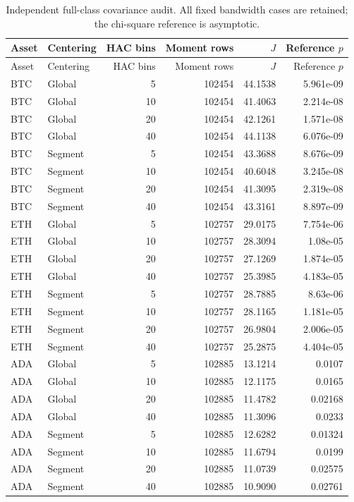 {\small
\begin{longtable}{llrrrr}
\caption{Independent full-class covariance audit. All fixed bandwidth cases are retained; the chi-square reference is asymptotic.}\label{tab:covariance_audit_complete}\\
\toprule Asset & Centering & HAC bins & Moment rows & $J$ & Reference $p$\\\midrule\endfirsthead
\toprule Asset & Centering & HAC bins & Moment rows & $J$ & Reference $p$\\\midrule\endhead
\bottomrule\endfoot
BTC & Global & 5 & 102454 & 44.1538 & 5.961e-09\\
BTC & Global & 10 & 102454 & 41.4063 & 2.214e-08\\
BTC & Global & 20 & 102454 & 42.1261 & 1.571e-08\\
BTC & Global & 40 & 102454 & 44.1138 & 6.076e-09\\
BTC & Segment & 5 & 102454 & 43.3688 & 8.676e-09\\
BTC & Segment & 10 & 102454 & 40.6048 & 3.245e-08\\
BTC & Segment & 20 & 102454 & 41.3095 & 2.319e-08\\
BTC & Segment & 40 & 102454 & 43.3161 & 8.897e-09\\
ETH & Global & 5 & 102757 & 29.0175 & 7.754e-06\\
ETH & Global & 10 & 102757 & 28.3094 & 1.08e-05\\
ETH & Global & 20 & 102757 & 27.1269 & 1.874e-05\\
ETH & Global & 40 & 102757 & 25.3985 & 4.183e-05\\
ETH & Segment & 5 & 102757 & 28.7885 & 8.63e-06\\
ETH & Segment & 10 & 102757 & 28.1165 & 1.181e-05\\
ETH & Segment & 20 & 102757 & 26.9804 & 2.006e-05\\
ETH & Segment & 40 & 102757 & 25.2875 & 4.404e-05\\
ADA & Global & 5 & 102885 & 13.1214 & 0.0107\\
ADA & Global & 10 & 102885 & 12.1175 & 0.0165\\
ADA & Global & 20 & 102885 & 11.4782 & 0.02168\\
ADA & Global & 40 & 102885 & 11.3096 & 0.0233\\
ADA & Segment & 5 & 102885 & 12.6282 & 0.01324\\
ADA & Segment & 10 & 102885 & 11.6794 & 0.0199\\
ADA & Segment & 20 & 102885 & 11.0739 & 0.02575\\
ADA & Segment & 40 & 102885 & 10.9090 & 0.02761\\
\end{longtable}
}

